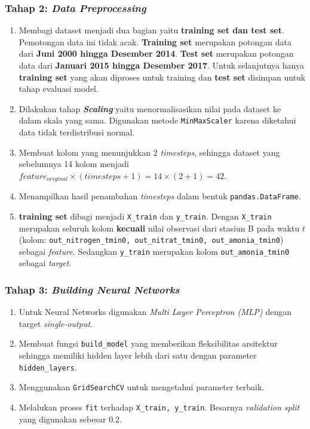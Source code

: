 \documentclass[11pt]{article}
\providecommand{\tightlist}{%
      \setlength{\itemsep}{0pt}\setlength{\parskip}{0pt}}
\begin{document}
\hypertarget{tahap-2-data-preprocessing}{%
\subsubsection{\texorpdfstring{Tahap 2: \emph{Data
Preprocessing}}{Tahap 2: Data Preprocessing}}\label{tahap-2-data-preprocessing}}

\begin{enumerate}
\def\labelenumi{\arabic{enumi}.}
\tightlist
\item
  Membagi dataset menjadi dua bagian yaitu \textbf{training set dan test
  set}. Pemotongan data ini tidak acak. \textbf{Training set} merupakan
  potongan data dari \textbf{Juni 2000 hingga Desember 2014}.
  \textbf{Test set} merupakan potongan data dari \textbf{Januari 2015
  hingga Desember 2017}. Untuk selanjutnya hanya \textbf{training set}
  yang akan diproses untuk training dan \textbf{test set} disimpan untuk
  tahap evaluasi model.
\item
  Dilakukan tahap \textbf{\emph{Scaling}} yaitu menormalisasikan nilai
  pada dataset ke dalam skala yang sama. Digunakan metode
  \texttt{MinMaxScaler} karena diketahui data tidak terdistribusi
  normal.
\item
  Membuat kolom yang menunjukkan \emph{\(2\) timesteps}, sehingga
  dataset yang sebelumnya 14 kolom menjadi
  \(feature_{original}\times(timesteps+1)=14\times(2+1)=42\).
\item
  Menampilkan hasil penambahan \emph{timesteps} dalam bentuk
  \texttt{pandas.DataFrame}.
\item
  \textbf{training set} dibagi menjadi \texttt{X\_train} dan
  \texttt{y\_train}. Dengan \texttt{X\_train} merupakan seluruh kolom
  \textbf{kecuali} nilai observasi dari stasiun B pada waktu \(t\)
  (kolom:
  \texttt{out\_nitrogen\_tmin0,\ out\_nitrat\_tmin0,\ out\_amonia\_tmin0})
  sebagai \emph{feature}. Sedangkan \texttt{y\_train} merupakan kolom
  \texttt{out\_amonia\_tmin0} sebagai \emph{target}.
\end{enumerate}

\hypertarget{tahap-3-building-neural-networks}{%
\subsubsection{\texorpdfstring{Tahap 3: \emph{Building Neural
Networks}}{Tahap 3: Building Neural Networks}}\label{tahap-3-building-neural-networks}}

\begin{enumerate}
\def\labelenumi{\arabic{enumi}.}
\tightlist
\item
  Untuk Neural Networks digunakan \emph{Multi Layer Perceptron (MLP)}
  dengan target \emph{single-output}.
\item
  Membuat fungsi \texttt{build\_model} yang memberikan fleksibilitas
  arsitektur sehingga memiliki hidden layer lebih dari satu dengan
  parameter \texttt{hidden\_layers}.
\item
  Menggunakan \texttt{GridSearchCV} untuk mengetahui parameter terbaik.
\item
  Melalukan proses \texttt{fit} terhadap \texttt{X\_train,\ y\_train}.
  Besarnya \emph{validation split} yang digunakan sebesar \(0.2\).
\end{enumerate}
\end{document}
